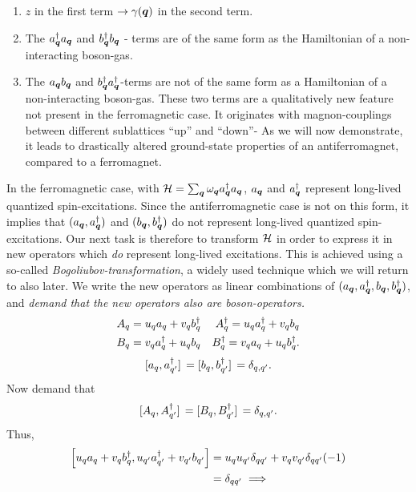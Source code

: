 \begin{enumerate}
	\item $z$ in the first term $\rightarrow \gamma(\bm{q})$ in the second term.
	\item The $a_{\bm{q}}^{\dagger}a_{\bm{q}}$ and $b_{\bm{q}}^{\dagger}b_{\bm{q}}$ - terms are of the same form as the Hamiltonian of a non-interacting boson-gas. 
	\item The $a_{\bm{q}}b_{\bm{q}}$ and $ b_{\bm{q}}^{\dagger}a_{\bm{q}}^{\dagger}$-terms are not of the same form as a Hamiltonian of a non-interacting boson-gas. These two terms are a qualitatively new feature not present in the ferromagnetic case. It originates with magnon-couplings between different sublattices ``up'' and ``down''- As we will now demonstrate, it leads to drastically altered ground-state properties of an antiferromagnet, compared to a ferromagnet. 
\end{enumerate}
In the ferromagnetic case, with $\mathcal{H} = \sum_{\bm{q}}\omega_{\bm{q}} a_{\bm{q}}^{\dagger} a_{\bm{q}}$, $a_{\bm{q}}$ and $a_{\bm{q}}^{\dagger}$ represent long-lived quantized spin-excitations. Since the antiferromagnetic case is not on this form, it implies that $(a_{\bm{q}},a_{\bm{q}}^{\dagger})$ and $(b_{\bm{q}},b_{\bm{q}}^{\dagger})$ do not represent long-lived quantized spin-excitations. Our next task is therefore to transform $\mathcal{H}$ in order to express it in new operators which \emph{do} represent long-lived excitations.
This is achieved using a so-called \emph{Bogoliubov-transformation}, a widely used technique which we will return to also later. We write the new operators as linear combinations of $(a_{\bm{q}},a_{\bm{q}}^{\dagger},b_{\bm{q}},b_{\bm{q}}^{\dagger})$, and \emph{demand that the new operators also are boson-operators.}
\begin{align}
	A_{q} = u_{q}a_{q} + v_{q}b_{q}^{\dagger} && 	A_{q}^{\dagger} = u_{q}a_{q}^{\dagger} + v_{q}b_{q}\\
	B_{q} = v_{q}a_{q}^{\dagger} + u_{q}b_{q} && 	 B_{q}^{\dagger} = v_{q}a_{q}+ u_{q}b_{q}^{\dagger}.
\end{align}
\begin{equation}
	\comm*{a_{q}}{a_{q'}^{\dg}} = \comm*{b_{q}}{b_{q'}^{\dg}} = \delta_{q,q'}.
\end{equation}
Now demand that 
\begin{equation}
	\comm*{A_{q}}{A_{q'}^{\dg}} = \comm*{B_{q}}{B_{q'}^{\dg}} = \delta_{q,q'}.
\end{equation}
Thus,
\begin{align*}
	\comm{u_{q}a_{q} + v_{q}b_{q}^{\dg}}{u_{q'}a_{q'}^{\dg} + v_{q'}b_{q'}} &= u_{q}u_{q'}\delta_{qq'} + v_{q}v_{q'}\delta_{qq'}(-1)\\
	&= \delta_{qq'}
	\implies	
\end{align*}
